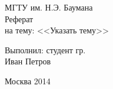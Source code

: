 \begin{center} 

\large МГТУ им. Н.Э. Баумана\\[5.5cm] 

\huge Реферат \\[0.6cm] %
\large на тему:  <<Указать тему>>\\[3.7cm]


\end{center} 

\begin{flushright}
Выполнил: студент гр.  \\
Иван Петров \\
\end{flushright}


\vfill 

\begin{center} 
\large Москва 2014
\end{center} 

\thispagestyle{empty}